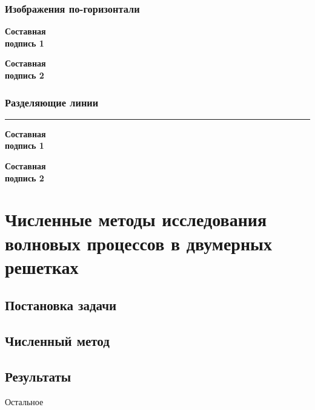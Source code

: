 \begin{frame}
    \frametitle{Изображения по-горизонтали}
    \begin{minipage}[t]{0.47\linewidth}
        \textbf{Составная \\ подпись 1}
    \end{minipage}
    \hfill
    \begin{minipage}[t]{0.47\linewidth}
        \textbf{Составная \\ подпись 2}
    \end{minipage}
\end{frame}


\begin{frame}
    \frametitle{Разделяющие линии}
    \begin{minipage}[c]{0.47\linewidth}
        \bigskip
        \hrule{}
        \bigskip
        \textbf{Составная \\ подпись 1}
    \end{minipage}
    \hfill
    \vrule{}
    \hfill
    \begin{minipage}[c]{0.47\linewidth}
        \flushright
        \textbf{Составная \\ подпись 2}
    \end{minipage}
\end{frame}

\section{Численные методы исследования волновых процессов в двумерных решетках}
\subsection{Постановка задачи}
\subsection{Численный метод}
\subsection{Результаты}
\begin{frame}
    \begin{center}
        \Huge
        Остальное
    \end{center}
\end{frame}

